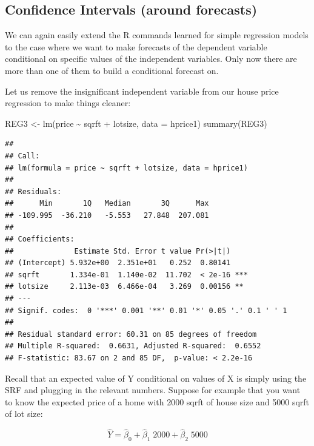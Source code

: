 \documentclass[
]{book}
\newenvironment{Shaded}{\begin{snugshade}}{\end{snugshade}}
\newcommand{\AttributeTok}[1]{\textcolor[rgb]{0.77,0.63,0.00}{#1}}
\newcommand{\FunctionTok}[1]{\textcolor[rgb]{0.00,0.00,0.00}{#1}}
\newcommand{\NormalTok}[1]{#1}
\newcommand{\OtherTok}[1]{\textcolor[rgb]{0.56,0.35,0.01}{#1}}
\newcommand{\SpecialCharTok}[1]{\textcolor[rgb]{0.00,0.00,0.00}{#1}}
\begin{document}
\hypertarget{confidence-intervals-around-forecasts-1}{%
\subsection{Confidence Intervals (around forecasts)}\label{confidence-intervals-around-forecasts-1}}

We can again easily extend the R commands learned for simple regression models to the case where we want to make forecasts of the dependent variable conditional on specific values of the independent variables. Only now there are more than one of them to build a conditional forecast on.

Let us remove the insignificant independent variable from our house price regression to make things cleaner:

\begin{Shaded}
\begin{Highlighting}[]
\NormalTok{REG3 }\OtherTok{\textless{}{-}} \FunctionTok{lm}\NormalTok{(price }\SpecialCharTok{\textasciitilde{}}\NormalTok{ sqrft }\SpecialCharTok{+}\NormalTok{ lotsize, }\AttributeTok{data =}\NormalTok{ hprice1)}
\FunctionTok{summary}\NormalTok{(REG3)}
\end{Highlighting}
\end{Shaded}

\begin{verbatim}
## 
## Call:
## lm(formula = price ~ sqrft + lotsize, data = hprice1)
## 
## Residuals:
##      Min       1Q   Median       3Q      Max 
## -109.995  -36.210   -5.553   27.848  207.081 
## 
## Coefficients:
##              Estimate Std. Error t value Pr(>|t|)    
## (Intercept) 5.932e+00  2.351e+01   0.252  0.80141    
## sqrft       1.334e-01  1.140e-02  11.702  < 2e-16 ***
## lotsize     2.113e-03  6.466e-04   3.269  0.00156 ** 
## ---
## Signif. codes:  0 '***' 0.001 '**' 0.01 '*' 0.05 '.' 0.1 ' ' 1
## 
## Residual standard error: 60.31 on 85 degrees of freedom
## Multiple R-squared:  0.6631, Adjusted R-squared:  0.6552 
## F-statistic: 83.67 on 2 and 85 DF,  p-value: < 2.2e-16
\end{verbatim}

Recall that an expected value of Y conditional on values of X is simply using the SRF and plugging in the relevant numbers. Suppose for example that you want to know the expected price of a home with 2000 sqrft of house size and 5000 sqrft of lot size:

\[\hat{Y} = \hat{\beta}_0 + \hat{\beta}_1 \; 2000 + \hat{\beta}_2 \; 5000\]
\end{document}
